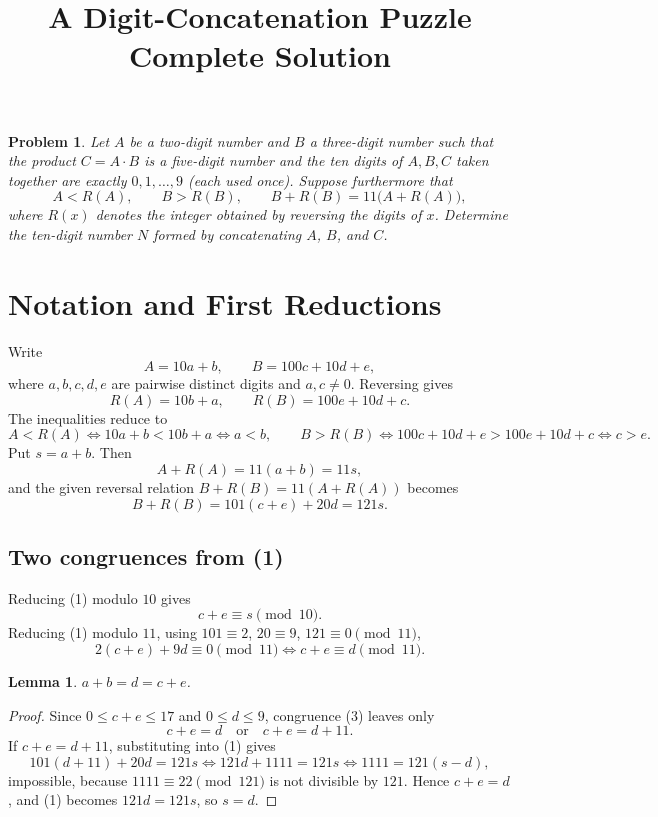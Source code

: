 \documentclass[10pt]{article}
\title{\vspace{-1.4em}\textbf{A Digit-Concatenation Puzzle}\\[0.2em]
\large Complete Solution}
\author{}
\date{}
\newtheorem{problem}{Problem}
\newtheorem{lemma}{Lemma}
\theoremstyle{definition}
\begin{document}
\maketitle
\vspace{-4.2em}

\begin{problem}
Let $A$ be a two-digit number and $B$ a three-digit number such that the product
$C=A\cdot B$ is a five-digit number and the ten digits of $A,B,C$ taken together are
exactly $0,1,\dots,9$ (each used once). Suppose furthermore that
\[
A<R(A),\qquad B>R(B),\qquad B+R(B)=11\bigl(A+R(A)\bigr),
\]
where $R(x)$ denotes the integer obtained by reversing the digits of $x$.
Determine the ten-digit number $N$ formed by concatenating $A$, $B$, and $C$.
\end{problem}

\section*{Notation and First Reductions}
Write
\[
A=10a+b,\qquad B=100c+10d+e,
\]
where $a,b,c,d,e$ are pairwise distinct digits and $a,c\neq 0$. Reversing gives
\[
R(A)=10b+a,\qquad R(B)=100e+10d+c.
\]
The inequalities reduce to
\[
A<R(A)\iff 10a+b<10b+a\iff a<b,
\qquad
B>R(B)\iff 100c+10d+e>100e+10d+c\iff c>e.
\]
Put $s=a+b$. Then
\[
A+R(A)=11(a+b)=11s,
\]
and the given reversal relation $B+R(B)=11(A+R(A))$ becomes
\[
B+R(B)=101(c+e)+20d=121s. \tag{1}
\]

\subsection*{Two congruences from (1)}
Reducing (1) modulo $10$ gives
\[
c+e\equiv s\pmod{10}. \tag{2}
\]
Reducing (1) modulo $11$, using $101\equiv 2$, $20\equiv 9$, $121\equiv 0\pmod{11}$,
\[
2(c+e)+9d\equiv 0\pmod{11}
\iff c+e\equiv d\pmod{11}. \tag{3}
\]

\begin{lemma}\label{lem:core}
$a+b=d=c+e$.
\end{lemma}
\begin{proof}
Since $0\le c+e\le 17$ and $0\le d\le 9$, congruence (3) leaves only
\[
c+e=d \quad\text{or}\quad c+e=d+11.
\]
If $c+e=d+11$, substituting into (1) gives
\[
101(d+11)+20d=121s
\iff 121d+1111=121s
\iff 1111=121(s-d),
\]
impossible, because $1111\equiv 22\pmod{121}$ is not divisible by $121$.
Hence $c+e=d$, and (1) becomes $121d=121s$, so $s=d$.
\end{proof}
\end{document}
